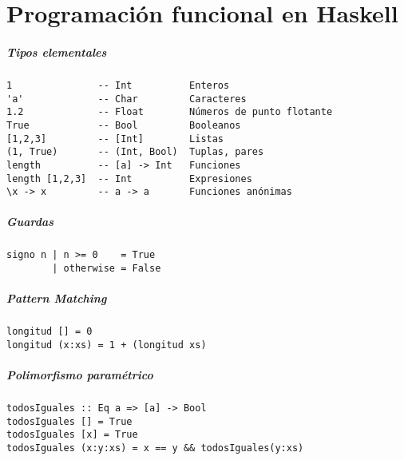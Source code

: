 \chapter{Programación funcional en Haskell}
\paragraph{Tipos elementales}
\begin{centrado}
	\begin{verbatim}
1               -- Int          Enteros
'a'             -- Char         Caracteres
1.2             -- Float        Números de punto flotante
True            -- Bool         Booleanos
[1,2,3]         -- [Int]        Listas
(1, True)       -- (Int, Bool)  Tuplas, pares
length          -- [a] -> Int   Funciones
length [1,2,3]  -- Int          Expresiones
\x -> x         -- a -> a       Funciones anónimas
	\end{verbatim}
\end{centrado}

\paragraph{Guardas}
\begin{centrado}
	\begin{verbatim}
signo n | n >= 0    = True
        | otherwise = False
	\end{verbatim}
\end{centrado}

\paragraph{Pattern Matching}
\begin{centrado}
	\begin{verbatim}
longitud [] = 0
longitud (x:xs) = 1 + (longitud xs)
	\end{verbatim}
\end{centrado}

\paragraph{Polimorfismo paramétrico}
\begin{centrado}
	\begin{verbatim}
todosIguales :: Eq a => [a] -> Bool
todosIguales [] = True
todosIguales [x] = True
todosIguales (x:y:xs) = x == y && todosIguales(y:xs)
	\end{verbatim}
\end{centrado}

